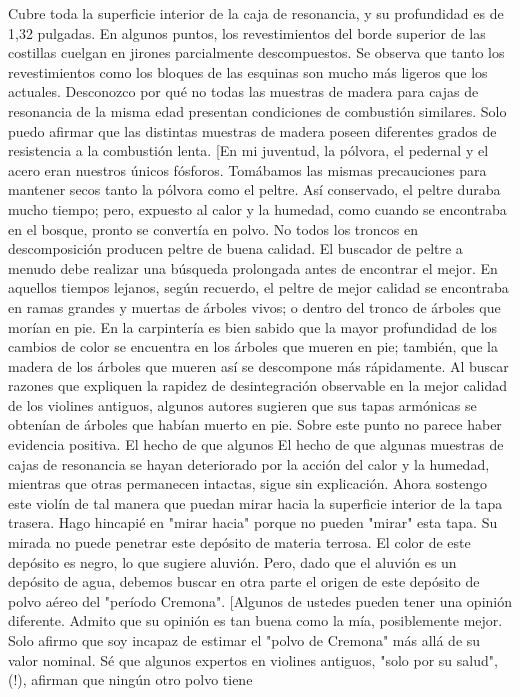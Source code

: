 Cubre toda la superficie interior de la caja de resonancia, y su profundidad es de 1,32 pulgadas. En algunos puntos, los revestimientos del borde superior de las costillas cuelgan en jirones parcialmente descompuestos. Se observa que tanto los revestimientos como los bloques de las esquinas son mucho más ligeros que los actuales.
Desconozco por qué no todas las muestras de madera para cajas de resonancia de la misma edad presentan condiciones de combustión similares. Solo puedo afirmar que las distintas muestras de madera poseen diferentes grados de resistencia a la combustión lenta.
[En mi juventud, la pólvora, el pedernal y el acero eran nuestros únicos fósforos. Tomábamos las mismas precauciones para mantener secos tanto la pólvora como el peltre. Así conservado, el peltre duraba mucho tiempo; pero, expuesto al calor y la humedad, como cuando se encontraba en el bosque, pronto se convertía en polvo. No todos los troncos en descomposición producen peltre de buena calidad. El buscador de peltre a menudo debe realizar una búsqueda prolongada antes de encontrar el mejor. En aquellos tiempos lejanos, según recuerdo, el peltre de mejor calidad se encontraba en ramas grandes y muertas de árboles vivos; o dentro del tronco de árboles que morían en pie. En la carpintería es bien sabido que la mayor profundidad de los cambios de color se encuentra en los árboles que mueren en pie; también, que la madera de los árboles que mueren así se descompone más rápidamente. Al buscar razones que expliquen la rapidez de desintegración observable en la mejor calidad de los violines antiguos, algunos autores sugieren que sus tapas armónicas se obtenían de árboles que habían muerto en pie. Sobre este punto no parece haber evidencia positiva. El hecho de que algunos
El hecho de que algunas muestras de cajas de resonancia se hayan deteriorado por la acción del calor y la humedad, mientras que otras permanecen intactas, sigue sin explicación.
Ahora sostengo este violín de tal manera que puedan mirar hacia la superficie interior de la tapa trasera. Hago hincapié en "mirar hacia" porque no pueden "mirar" esta tapa. Su mirada no puede penetrar este depósito de materia terrosa. El color de este depósito es negro, lo que sugiere aluvión. Pero, dado que el aluvión es un depósito de agua, debemos buscar en otra parte el origen de este depósito de polvo aéreo del "período Cremona".
[Algunos de ustedes pueden tener una opinión diferente. Admito que su opinión es tan buena como la mía, posiblemente mejor. Solo afirmo que soy incapaz de estimar el "polvo de Cremona" más allá de su valor nominal. Sé que algunos expertos en violines antiguos, "solo por su salud", (!), afirman que ningún otro polvo tiene
